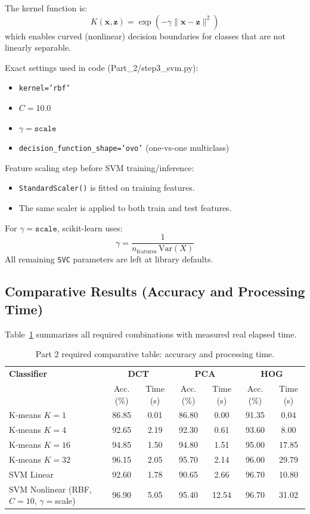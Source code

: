 \documentclass[12pt, a4paper]{article}
\begin{document}
The kernel function is:
\[
K(\mathbf{x},\mathbf{z}) = \exp\left(-\gamma\lVert \mathbf{x}-\mathbf{z} \rVert^2\right)
\]
which enables curved (nonlinear) decision boundaries for classes that are not linearly separable.

Exact settings used in code (Part\_2/step3\_svm.py):
\begin{itemize}
    \item \texttt{kernel='rbf'}
    \item \(C = 10.0\)
    \item \(\gamma = \texttt{scale}\)
    \item \texttt{decision\_function\_shape='ovo'} (one-vs-one multiclass)
\end{itemize}

Feature scaling step before SVM training/inference:
\begin{itemize}
    \item \texttt{StandardScaler()} is fitted on training features.
    \item The same scaler is applied to both train and test features.
\end{itemize}

For \(\gamma = \texttt{scale}\), scikit-learn uses:
\[
\gamma = \frac{1}{n_{\text{features}}\,\mathrm{Var}(X)}
\]
All remaining \texttt{SVC} parameters are left at library defaults.

\subsection{Comparative Results (Accuracy and Processing Time)}
Table~\ref{tab:part2_results} summarizes all required combinations with measured real elapsed time.

\begin{table}[H]
\centering
\small
\setlength{\tabcolsep}{5pt}
\begin{tabular}{l|cc|cc|cc}
\toprule
\textbf{Classifier} & \multicolumn{2}{c|}{\textbf{DCT}} & \multicolumn{2}{c|}{\textbf{PCA}} & \multicolumn{2}{c}{\textbf{HOG}} \\
 & Acc. (\%) & Time (s) & Acc. (\%) & Time (s) & Acc. (\%) & Time (s) \\
\midrule
K-means \(K=1\)  & 86.85 & 0.01 & 86.80 & 0.00 & 91.35 & 0.04 \\
K-means \(K=4\)  & 92.65 & 2.19 & 92.30 & 0.61 & 93.60 & 8.00 \\
K-means \(K=16\) & 94.85 & 1.50 & 94.80 & 1.51 & 95.00 & 17.85 \\
K-means \(K=32\) & 96.15 & 2.05 & 95.70 & 2.14 & 96.00 & 29.79 \\
SVM Linear         & 92.60 & 1.78 & 90.65 & 2.66 & 96.70 & 10.80 \\
SVM Nonlinear (RBF, \(C=10\), \(\gamma=\)scale) & 96.90 & 5.05 & 95.40 & 12.54 & 96.70 & 31.02 \\
\bottomrule
\end{tabular}
\caption{Part 2 required comparative table: accuracy and processing time.}
\label{tab:part2_results}
\end{table}
\end{document}
